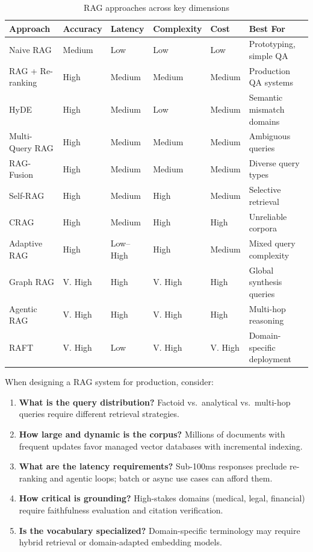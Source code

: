 \begin{table}[ht!]
\centering
\caption{RAG approaches across key dimensions}
{\footnotesize
\begin{tabular}{@{}llllll@{}}
\toprule
\textbf{Approach} & \textbf{Accuracy} & \textbf{Latency} & \textbf{Complexity} & \textbf{Cost} & \textbf{Best For} \\
\midrule
Naive RAG \cite{lewis2020retrieval} & Medium & Low & Low & Low & Prototyping, simple QA \\
RAG + Re-ranking \cite{nogueira2019passage} & High & Medium & Medium & Medium & Production QA systems \\
HyDE \cite{gao2022precise} & High & Medium & Low & Medium & Semantic mismatch domains \\
Multi-Query RAG & High & Medium & Medium & Medium & Ambiguous queries \\
RAG-Fusion \cite{rackauckas2023ragfusion} & High & Medium & Medium & Medium & Diverse query types \\
Self-RAG \cite{asai2023selfrag} & High & Medium & High & Medium & Selective retrieval \\
CRAG \cite{yan2024crag} & High & Medium & High & High & Unreliable corpora \\
Adaptive RAG \cite{jeong2024adaptive} & High & Low--High & High & Medium & Mixed query complexity \\
Graph RAG \cite{edge2024local} & V. High & High & V. High & High & Global synthesis queries \\
Agentic RAG & V. High & High & V. High & High & Multi-hop reasoning \\
RAFT \cite{zhang2024raft} & V. High & Low & V. High & V. High & Domain-specific deployment \\
\bottomrule
\end{tabular}
}
\end{table}

\begin{questionbox}
When designing a RAG system for production, consider:

\begin{enumerate}
  \item \textbf{What is the query distribution?} Factoid vs.~analytical vs.~multi-hop queries require different retrieval strategies.
  \item \textbf{How large and dynamic is the corpus?} Millions of documents with frequent updates favor managed vector databases with incremental indexing.
  \item \textbf{What are the latency requirements?} Sub-100ms responses preclude re-ranking and agentic loops; batch or async use cases can afford them.
  \item \textbf{How critical is grounding?} High-stakes domains (medical, legal, financial) require faithfulness evaluation and citation verification.
  \item \textbf{Is the vocabulary specialized?} Domain-specific terminology may require hybrid retrieval or domain-adapted embedding models.
\end{enumerate}
\end{questionbox}

